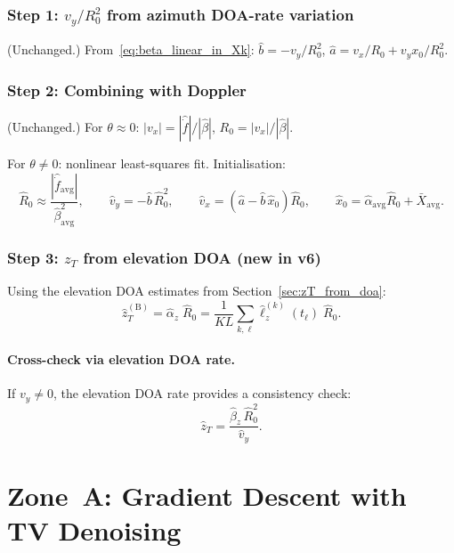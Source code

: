 \documentclass[11pt,a4paper]{article}
\begin{document}
\subsubsection{Step 1: $v_y/R_0^2$ from azimuth DOA-rate variation}
(Unchanged.)
From~\eqref{eq:beta_linear_in_Xk}:
$\hat{b}=-v_y/R_0^2$, $\hat{a}=v_x/R_0+v_y x_0/R_0^2$.

\subsubsection{Step 2: Combining with Doppler}
(Unchanged.)
For $\theta\approx 0$:
$|v_x|=|\hat{\dot{f}}|/|\hat{\beta}|$,\;
$R_0=|v_x|/|\hat{\beta}|$.

For $\theta\ne 0$: nonlinear least-squares fit.  Initialisation:
\begin{equation}
  \hat{R}_0 \approx
  \frac{|\hat{\dot{f}}_{\mathrm{avg}}|}
  {\hat{\beta}_{\mathrm{avg}}^2},\qquad
  \hat{v}_y = -\hat{b}\,\hat{R}_0^2,\qquad
  \hat{v}_x = (\hat{a}-\hat{b}\,\hat{x}_0)\hat{R}_0,\qquad
  \hat{x}_0 = \hat{\alpha}_{\mathrm{avg}}\hat{R}_0
  +\bar{X}_{\mathrm{avg}}.
  \label{eq:joint_init}
\end{equation}

\subsubsection{Step 3: $z_T$ from elevation DOA (\textbf{new in v6})}

Using the elevation DOA estimates from
Section~\ref{sec:zT_from_doa}:
\begin{equation}
  \boxed{
  \hat{z}_T^{(\mathrm{B})} = \hat{\alpha}_z\;\hat{R}_0
  = \frac{1}{KL}\sum_{k,\ell}\hat{\ell}_z^{(k)}(t_\ell)\;\hat{R}_0.}
  \label{eq:zT_zone_b}
\end{equation}

\paragraph{Cross-check via elevation DOA rate.}
If $v_y\ne 0$, the elevation DOA rate provides a consistency check:
\begin{equation}
  \hat{z}_T = \frac{\hat{\beta}_z\,\hat{R}_0^2}{\hat{v}_y}.
  \label{eq:zT_crosscheck}
\end{equation}

\section{Zone~A: Gradient Descent with TV Denoising}
\label{sec:zone_a}
\end{document}
